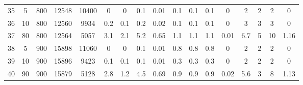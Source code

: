 \documentclass[11pt]{article}
\begin{document}
\begin{appendices}
\begin{landscape}
\begin{longtable}[c]{ccccc|cccc|cccc|cccc}
				35 & 5 & 800 & 12548 & 10400 & 0 & 0 & 0.1 & 0.01 & 0.1 & 0.1 & 0.1 & 0 & 2 & 2 & 2 & 0 \\
				36 & 10 & 800 & 12560 & 9934 & 0.2 & 0.1 & 0.2 & 0.02 & 0.1 & 0.1 & 0.1 & 0 & 3 & 3 & 3 & 0 \\
				37 & 80 & 800 & 12564 & 5057 & 3.1 & 2.1 & 5.2 & 0.65 & 1.1 & 1.1 & 1.1 & 0.01 & 6.7 & 5 & 10 & 1.16 \\
				\rowcolor[HTML]{EFEFEF} 
				38 & 5 & 900 & 15898 & 11060 & 0 & 0 & 0.1 & 0.01 & 0.8 & 0.8 & 0.8 & 0 & 2 & 2 & 2 & 0 \\
				\rowcolor[HTML]{EFEFEF} 
				39 & 10 & 900 & 15896 & 9423 & 0.1 & 0.1 & 0.1 & 0.01 & 0.3 & 0.3 & 0.3 & 0 & 2 & 2 & 2 & 0 \\
				\rowcolor[HTML]{EFEFEF} 
				40 & 90 & 900 & 15879 & 5128 & 2.8 & 1.2 & 4.5 & 0.69 & 0.9 & 0.9 & 0.9 & 0.02 & 5.6 & 3 & 8 & 1.13
			\end{longtable}
		\end{landscape}
		

\end{appendices}
\end{document}
